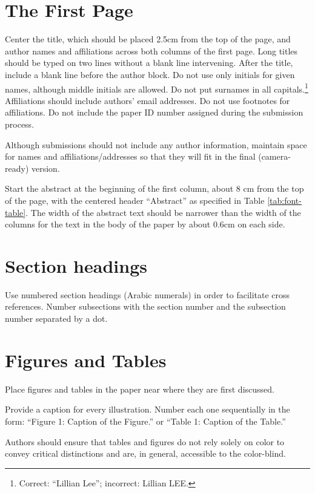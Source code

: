 \documentclass[11pt,a4paper]{article}
\begin{document}
\section{The First Page}
\label{ssec:first}

Center the title, which should be placed 2.5cm from the top of the page,
\iftaclfinal
and author names and affiliations
\fi
across both columns of the first page. Long titles should be typed on two lines
without a blank line intervening.
\iftaclfinal
After the title, include a blank line before the author block.
Do not use only initials for given names, although middle initials are allowed.
Do not put surnames in all capitals.\footnote{Correct: ``Lillian Lee'';
incorrect: Lillian LEE.} Affiliations should include authors' email
addresses. Do not use footnotes for affiliations.
\else
Do not include the paper ID number assigned during the submission process.
\fi

\iftaclfinal
\else
Although submissions should not include any author information, maintain space
for names and affiliations/addresses so that they will fit in the final
(camera-ready)
version.
\fi


Start the abstract at the beginning of the first
column, about 8 cm from the top of the page, with the centered header
``Abstract'' as specified in Table \ref{tab:font-table}.
The width of the abstract text
should be narrower than the width of the columns for the text in the body of the
paper by about 0.6cm on each side.

\section{Section headings}

Use numbered section headings (Arabic numerals) in order to facilitate cross
references. Number subsections with the section number and the subsection number
separated by a dot.



\section{Figures and Tables}

Place figures and tables in the paper near where they are first discussed.

Provide a caption for every illustration. Number each one
sequentially in the form:  ``Figure 1: Caption of the Figure.'' or ``Table 1:
Caption of the Table.''

Authors should ensure that tables and figures do not rely solely on color to
convey critical distinctions and are, in general,  accessible to the
color-blind.
\end{document}
